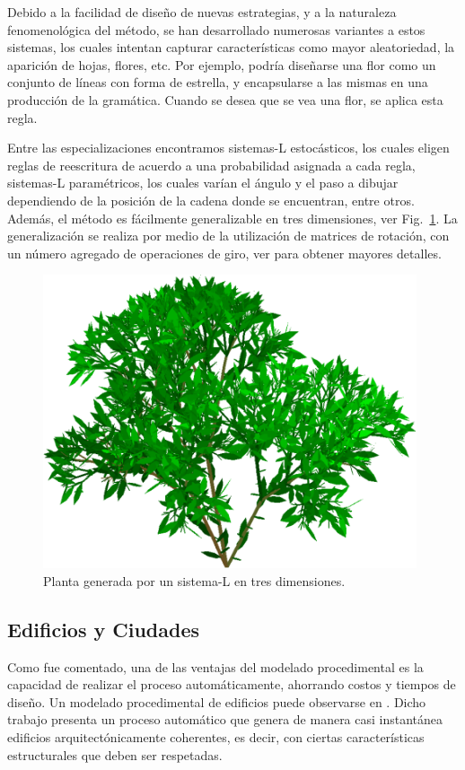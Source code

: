 Debido a la facilidad de diseño de nuevas estrategias, y a la naturaleza fenomenológica del método, se han desarrollado numerosas variantes a estos sistemas, los cuales intentan capturar características como mayor aleatoriedad, la aparición de hojas, flores, etc.
Por ejemplo, podría diseñarse una flor como un conjunto de líneas con forma de estrella, y encapsularse a las mismas en una producción de la gramática.
Cuando se desea que se vea una flor, se aplica esta regla.


Entre las especializaciones encontramos sistemas-L estocásticos, los cuales eligen reglas de reescritura de acuerdo a una probabilidad asignada a cada regla, sistemas-L paramétricos, los cuales varían el ángulo y el paso a dibujar dependiendo de la posición de la cadena donde se encuentran, entre otros.
Además, el método es fácilmente generalizable en tres dimensiones, ver Fig.~\ref{fg:sistemasL3D}.
La generalización se realiza por medio de la utilización de matrices de rotación, con un número agregado de operaciones de giro, ver \cite{Prusinkiewicz1990} para obtener mayores detalles.

\begin{figure}
\center
\includegraphics[width=11cm]{figures/3dlsystem}
\caption[Sistema-L en tres dimensiones.]{Planta generada por un sistema-L en tres dimensiones.}
\label{fg:sistemasL3D}
\end{figure}

\subsection{Edificios y Ciudades}
Como fue comentado, una de las ventajas del modelado procedimental es la capacidad de realizar el proceso automáticamente, ahorrando costos y tiempos de diseño.
Un modelado procedimental de edificios puede observarse en \cite{Wonka2003}.
Dicho trabajo presenta un proceso automático que genera de manera casi instantánea edificios arquitectónicamente coherentes, es decir, con ciertas características estructurales que deben ser respetadas.

